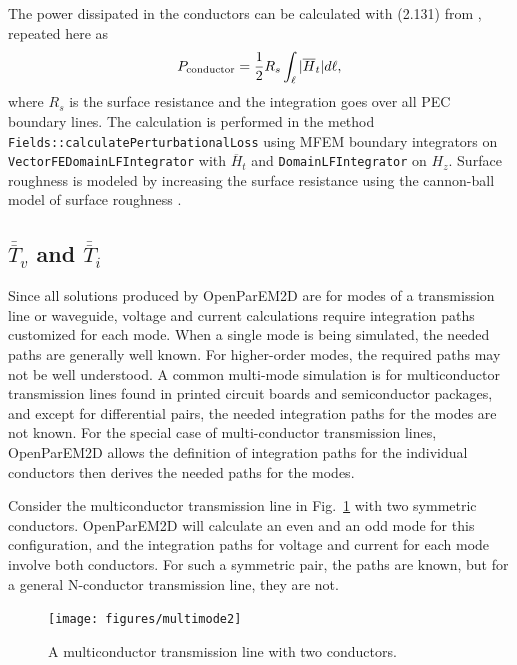 \documentclass[titlepage]{article}
\renewcommand\_{\textunderscore\linebreak[1]}
\begin{document}
The power dissipated in the conductors can be calculated with (2.131) from \cite{Pozar}, repeated here as
\begin{equation}
P_{\textnormal{conductor}}=\frac{1}{2}R_s\int_{\ell}|\overline{H}_t|d\ell,
\end{equation}
where $R_s$ is the surface resistance and the integration goes over all PEC boundary lines.
The calculation is performed in the method \texttt{Fields::calculatePerturbationalLoss} using MFEM boundary integrators on \texttt{VectorFEDomainLFIntegrator} with $\overline{H}_t$ and \texttt{DomainLFIntegrator} on $H_z$. Surface roughness is modeled by increasing the surface resistance using the cannon-ball model of surface roughness \cite{Dmitriev-Zdorov}.

\subsection{$\overline{\overline{T}}_v$ and $\overline{\overline{T}}_i$}

Since all solutions produced by OpenParEM2D are for modes of a transmission line or waveguide, voltage and current calculations require integration paths customized for each mode.  When a single mode is being simulated, the needed paths are generally well known. For higher-order modes, the required paths may not be well understood.  A common multi-mode simulation is  
for multiconductor transmission lines found in printed circuit boards and semiconductor packages, and except for differential pairs, the needed integration paths for the modes are not known.  For the special case of multi-conductor transmission lines, OpenParEM2D allows the definition of integration paths for the individual conductors then derives the needed paths for the modes.

Consider the multiconductor transmission line in Fig.~\ref{fig:multimode} with two symmetric conductors. OpenParEM2D will calculate an even and an odd mode for this configuration, and the integration paths for voltage and current for each mode involve both conductors.  For such a symmetric pair, the paths are known, but for a general N-conductor transmission line, they are not.

\begin{figure}
  \centering
  \texttt{[image: figures/multimode2]}
  \caption{A multiconductor transmission line with two conductors.}
  \label{fig:multimode}
\end{figure}
\end{document}
